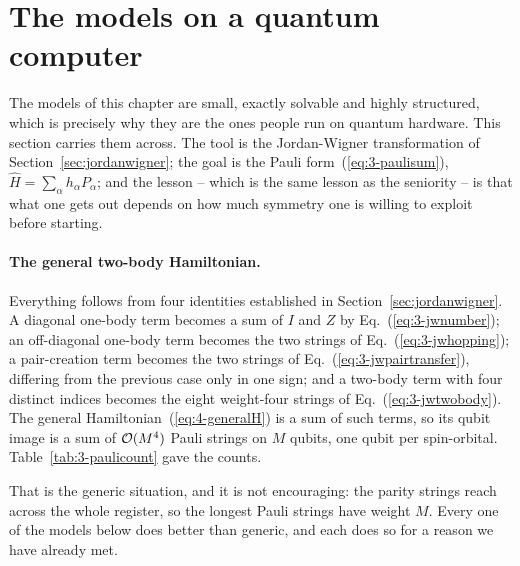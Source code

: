 \section{The models on a quantum computer}
\label{sec:qubitmodels}

The models of this chapter are small, exactly solvable and highly structured,
which is precisely why they are the ones people run on quantum hardware.  This
section carries them across.  The tool is the Jordan-Wigner transformation of
Section~\ref{sec:jordanwigner}; the goal is the Pauli
form~(\ref{eq:3-paulisum}), $\hat{H}=\sum_{\alpha}h_{\alpha}P_{\alpha}$; and
the lesson -- which is the same lesson as the seniority -- is that what one
gets out depends on how much symmetry one is willing to exploit before
starting.

\paragraph{The general two-body Hamiltonian.}
Everything follows from four identities established in
Section~\ref{sec:jordanwigner}.  A diagonal one-body term becomes a sum of
$I$ and $Z$ by Eq.~(\ref{eq:3-jwnumber}); an off-diagonal one-body term
becomes the two strings of Eq.~(\ref{eq:3-jwhopping}); a pair-creation term
becomes the two strings of Eq.~(\ref{eq:3-jwpairtransfer}), differing from
the previous case only in one sign; and a two-body term with four distinct
indices becomes the eight weight-four strings of Eq.~(\ref{eq:3-jwtwobody}).
The general Hamiltonian~(\ref{eq:4-generalH}) is a sum of such terms, so its
qubit image is a sum of $\mathcal{O}(M^4)$ Pauli strings on $M$ qubits, one qubit per
spin-orbital.  Table~\ref{tab:3-paulicount} gave the counts.

That is the generic situation, and it is not encouraging: the parity strings
reach across the whole register, so the longest Pauli strings have weight $M$.
Every one of the models below does better than generic, and each does so for a
reason we have already met.

